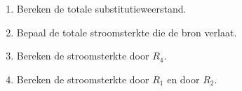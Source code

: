 \documentclass[a4paper, 11pt]{article}
\begin{document}
\begin{enumerate}[label=\alph*)]
    \item Bereken de totale substitutieweerstand.
    \vspace{4.5cm}
    \item Bepaal de totale stroomsterkte die de bron verlaat.
    \vspace{4.5cm}
    \item Bereken de stroomsterkte door $R_4$.
    \vspace{4.5cm}
    \item Bereken de stroomsterkte door $R_1$ en door $R_2$.
    \vfill
\end{enumerate}
\end{document}
